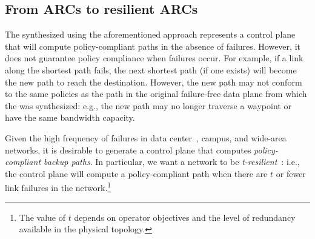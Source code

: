 \subsection{From ARCs to resilient ARCs}

%

The \ARC synthesized using the aforementioned approach represents a control
plane that will compute policy-compliant paths in the absence of failures.
However, it does not guarantee policy compliance when failures occur. For
example, if a link along the shortest path fails, the next shortest path (if
one exists) will become the new path to reach the destination. However, the
new path may not conform to the same policies as the path in the original
failure-free data plane from which the \ARC was synthesized: e.g., the new
path may no longer traverse a waypoint or have the same bandwidth capacity.

Given the high frequency of failures in data center~\cite{datacenterfailures},
campus, and wide-area~\cite{turner10:sigcomm} networks, it is desirable to
generate a control plane that computes {\em policy-compliant backup paths}.
In particular, we want a network to be {\em t-resilient}~\cite{plinko}: i.e.,
the control plane will compute a policy-compliant path when there are $t$ or
fewer link failures in the network.\footnote{The value of $t$ depends on
operator objectives and the level of redundancy available in the physical
topology.} 


